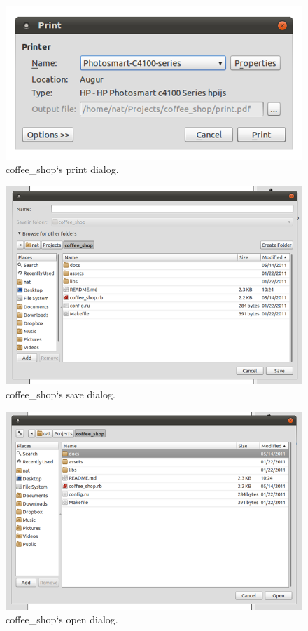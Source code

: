 \documentclass[10pt]{article}
\begin{document}
\begin{figure}
   \centering
      \includegraphics[width=130mm]{images/coffee_shop5.png}
   \caption{coffee\_shop`s print dialog.}
\end{figure}

\begin{figure}
   \centering
      \includegraphics[width=130mm]{images/coffee_shop6.png}
   \caption{coffee\_shop`s save dialog.}
\end{figure}

\begin{figure}
   \centering
      \includegraphics[width=130mm]{images/coffee_shop7.png}
   \caption{coffee\_shop`s open dialog.}
\end{figure}
\end{document}
